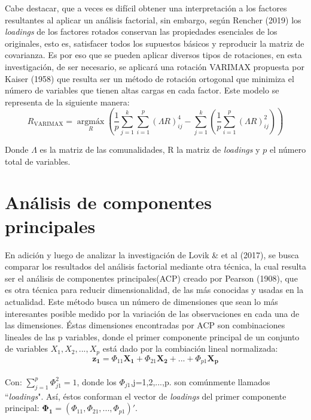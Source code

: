 \documentclass{report}
\begin{document}
Cabe destacar, que a veces es difícil obtener una interpretación a los factores resultantes al aplicar un análisis factorial, sin embargo, según Rencher (2019) los \textit{loadings} de los factores rotados conservan las propiedades esenciales de los originales, esto es, satisfacer todos los supuestos básicos y reproducir la matriz de covarianza. Es por eso que se pueden aplicar diversos tipos de rotaciones, en esta investigación, de ser necesario, se aplicará una rotación VARIMAX propuesta por Kaiser (1958) que resulta ser un método de rotación ortogonal que minimiza el número de variables que tienen altas cargas en cada factor. Este modelo se representa de la siguiente manera:\\
\begin{equation}
    R_{\text{VARIMAX}}=\underset{R}{\operatorname{arg máx}} \left(\frac{1}{p}\sum_{j=1}^{k}\sum_{i=1}^{p}(\Lambda R)_{ij}^{4}-\sum_{j=1}^{k}\left(\frac{1}{p}\sum_{i=1}^{p} (\Lambda R)_{ij}^{2} \right)\right)
\end{equation}

Donde $\Lambda$ es la matriz de las comunalidades, R la matriz de \textit{loadings} y $p$ el número total de variables.


\newpage
\section{Análisis de componentes principales}
En adición y luego de analizar la investigación de Lovik \& et al (2017), se busca comparar los resultados del análisis factorial mediante otra técnica, la cual resulta ser el análisis de componentes principales(ACP) creado por Pearson (1908), que es otra técnica para reducir dimensionalidad, de las más conocidas y usadas en la actualidad. Este método busca un número de dimensiones que sean lo más interesantes posible medido por la variación de las observaciones en cada una de las dimensiones. Éstas dimensiones encontradas por ACP son combinaciones lineales de las p variables, donde el primer componente principal de un conjunto de variables $X_{1}, X_{2}, ..., X_{p}$ está dado por la combiación lineal normalizada:\\
	 \begin{equation}
	     \mathbf{z_{1}}=\Phi_{11}\mathbf{X_{1}}+\Phi_{21}\mathbf{X_{2}}+...+\Phi_{p1}\mathbf{X_{p}}
	 \end{equation}\\
	 
Con: $\sum_{j=1}^{p}\Phi^{2}_{j1}=1$, donde los $\Phi_{j1}$,j=1,2,...,p. son comúnmente llamados ``\textit{loadings}". Así, éstos conforman el vector de \textit{loadings} del primer componente principal: $\mathbf{\Phi_{1}}=(\Phi_{11},\Phi_{21},...,\Phi_{p1})'$.\\
\end{document}

